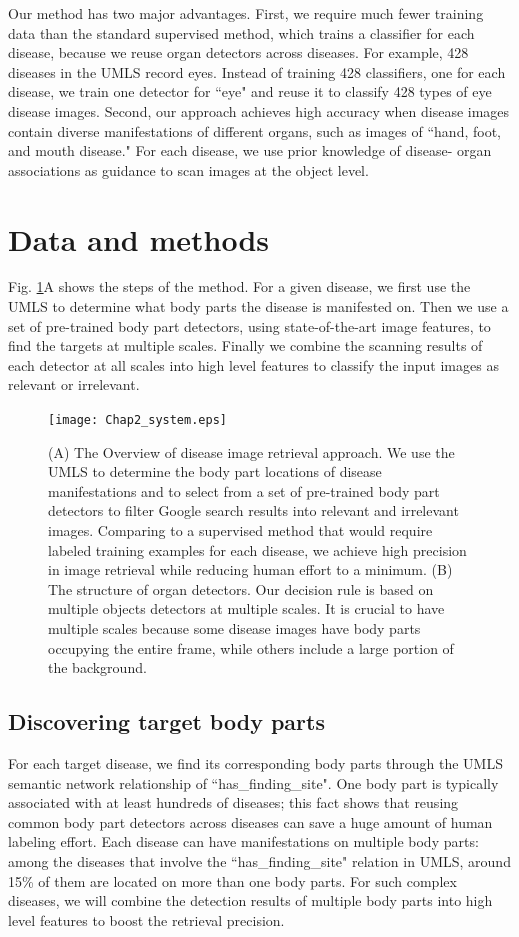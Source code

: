 Our method has two major advantages. First, we require much
fewer training data than the standard supervised method, which
trains a classifier for each disease, because we reuse organ detectors
across diseases. For example, 428 diseases in the UMLS
record eyes. Instead of training 428 classifiers, one for each
disease, we train one detector for ``eye" and reuse it to classify
428 types of eye disease images. Second, our approach achieves
high accuracy when disease images contain diverse manifestations
of different organs, such as images of ``hand, foot, and mouth
disease." For each disease, we use prior knowledge of disease-
organ associations as guidance to scan images at the object level.


\section{Data and methods}

Fig. {\ref{Chap2_system}}A shows the steps of the method. For a given disease, we first use the UMLS to determine what body parts the disease is manifested on. Then we use a set of pre-trained body part detectors, using state-of-the-art image features, to find the targets at multiple scales. Finally we combine the scanning results of each detector at all scales into high level features to classify the input images as relevant or irrelevant.
\begin{figure}[t]
\vspace{0em}
\centering
\texttt{[image: Chap2\_system.eps]}
\vspace {0em}\caption{(A) The Overview of disease image retrieval approach. We use the UMLS to determine the body part locations of disease manifestations and to select from a set of pre-trained body part detectors to filter Google search results into relevant and irrelevant images. Comparing to a supervised method that would require labeled training examples for each disease, we achieve high precision in image retrieval while reducing human effort to a minimum. (B) The structure of organ detectors. Our decision rule is based on multiple objects detectors at multiple scales. It is crucial to have multiple scales because some disease images have body parts occupying the entire frame, while others include a large portion of the background.}
\label{Chap2_system}
\vspace {0em}
\end{figure}


\subsection{Discovering target body parts}
For each target disease, we find its corresponding body parts through the UMLS semantic network relationship of ``has\_finding\_site". One body part is typically associated with at least hundreds of diseases; this fact shows that reusing common body part detectors across diseases can save a huge amount of human labeling effort. Each disease can have manifestations on multiple body parts:  among the diseases that involve the ``has\_finding\_site" relation in UMLS, around 15\% of them are located on more than one body parts. For such complex diseases, we will combine the detection results of multiple body parts into high level features to boost the retrieval precision.

